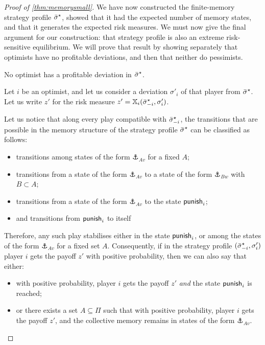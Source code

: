 \begin{proof}[Proof of \cref{thm:memorysmall}]
We have now constructed the finite-memory strategy profile ${\bar{\sigma}}^\star$, showed that it had the expected number of memory states, and that it generates the expected risk measures.
We must now give the final argument for our construction: that strategy profile is also an extreme risk-sensitive equilibrium.
We will prove that result by showing separately that optimists have no profitable deviations, and then that neither do pessimists.

\begin{proposition}\label{prop:NodeviationOpt}
    No optimist has a profitable deviation in ${\bar{\sigma}}^\star$.
\end{proposition}

\begin{claimproof}
    Let $i$ be an optimist, and let us consider a deviation $\sigma'_i$ of that player from ${\bar{\sigma}}^\star$. Let us write $z'$ for the risk measure $z' = \mathbb{X}_i({\bar{\sigma}}^\star_{-i}, \sigma'_i)$.

    Let us notice that along every play compatible with ${\bar{\sigma}}^\star_{-i}$, the transitions that are possible in the memory structure of the strategy profile ${\bar{\sigma}}^\star$ can be classified as follows:
    \begin{itemize}
        \item transitions among states of the form $\anchor_{A v}$ for a fixed $A$;
        
        \item transitions from a state of the form $\anchor_{A v}$ to a state of the form $\anchor_{B w}$ with $B \subset A$;

        \item transitions from a state of the form $\anchor_{A v}$ to the state $\mathsf{punish}_i$;

        \item and transitions from $\mathsf{punish}_i$ to itself
    \end{itemize}
    Therefore, any such play stabilises either in the state $\mathsf{punish}_i$, or among the states of the form $\anchor_{A v}$ for a fixed set $A$.
    Consequently, if in the strategy profile $({\bar{\sigma}}^\star_{-i}, \sigma'_i)$ player $i$ gets the payoff $z'$ with positive probability, then we can also say that either:
    \begin{itemize}
        \item with positive probability, player $i$ gets the payoff $z'$ \emph{and} the state $\mathsf{punish}_i$ is reached;

        \item or there exists a set $A \subseteq \Pi$ such that with positive probability, player $i$ gets the payoff $z'$, and the collective memory remains in states of the form $\anchor_{A v}$.
    \end{itemize}


\end{claimproof}
\end{proof}
